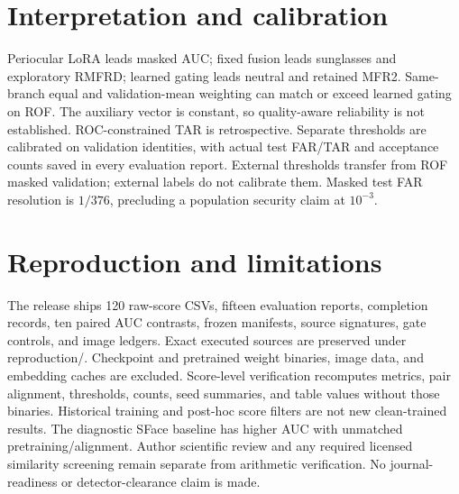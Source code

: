 \documentclass[10pt,journal,onecolumn,compsoc]{IEEEtran}
\begin{document}
\section{Interpretation and calibration}
Periocular LoRA leads masked AUC; fixed fusion leads sunglasses and exploratory RMFRD; learned gating leads neutral and retained MFR2. Same-branch equal and validation-mean weighting can match or exceed learned gating on ROF. The auxiliary vector is constant, so quality-aware reliability is not established. ROC-constrained TAR is retrospective. Separate thresholds are calibrated on validation identities, with actual test FAR/TAR and acceptance counts saved in every evaluation report. External thresholds transfer from ROF masked validation; external labels do not calibrate them. Masked test FAR resolution is $1/376$, precluding a population security claim at $10^{-3}$.

\section{Reproduction and limitations}
The release ships 120 raw-score CSVs, fifteen evaluation reports, completion records, ten paired AUC contrasts, frozen manifests, source signatures, gate controls, and image ledgers. Exact executed sources are preserved under reproduction/. Checkpoint and pretrained weight binaries, image data, and embedding caches are excluded. Score-level verification recomputes metrics, pair alignment, thresholds, counts, seed summaries, and table values without those binaries. Historical training and post-hoc score filters are not new clean-trained results. The diagnostic SFace baseline has higher AUC with unmatched pretraining/alignment. Author scientific review and any required licensed similarity screening remain separate from arithmetic verification. No journal-readiness or detector-clearance claim is made.
\end{document}
